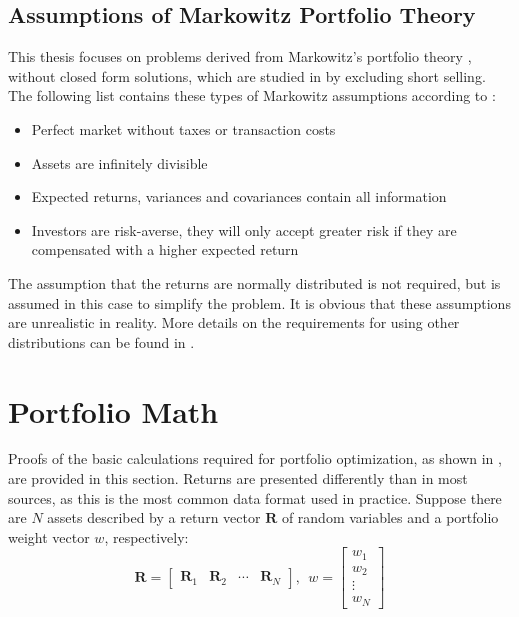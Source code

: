 \documentclass[
  oneside]{book}
\providecommand{\tightlist}{%
  \setlength{\itemsep}{0pt}\setlength{\parskip}{0pt}}
\begin{document}
\hypertarget{assumptions-of-markowitz-portfolio-theory}{%
\subsection{Assumptions of Markowitz Portfolio Theory}\label{assumptions-of-markowitz-portfolio-theory}}

This thesis focuses on problems derived from Markowitz's portfolio theory \citep{Mark1959}, without closed form solutions, which are studied in \citep{Mari2005} by excluding short selling. The following list contains these types of Markowitz assumptions according to \citep{Mari2005}:

\vspace{-0.4cm}

\begin{itemize}
\tightlist
\item
  Perfect market without taxes or transaction costs
\item
  Assets are infinitely divisible
\item
  Expected returns, variances and covariances contain all information
\item
  Investors are risk-averse, they will only accept greater risk if they
  are compensated with a higher expected return
\end{itemize}

The assumption that the returns are normally distributed is not required, but is assumed in this case to simplify the problem. It is obvious that these assumptions are unrealistic in reality. More details on the requirements for using other distributions can be found in \citep{Mari2005}.

\hypertarget{portfolio-math}{%
\section{Portfolio Math}\label{portfolio-math}}

Proofs of the basic calculations required for portfolio optimization, as shown in \citep{Eric2021}, are provided in this section. Returns are presented differently than in most sources, as this is the most common data format used in practice. Suppose there are \(N\) assets described by a return vector \(\pmb{R}\) of random variables and a portfolio weight vector \(w\), respectively:
\[
  \pmb{R} = 
  \begin{bmatrix}
    \pmb{R}_{1} & \pmb{R}_{2} & \cdots & \pmb{R}_{N}  
 \end{bmatrix}
 , \ \ 
 w = 
  \begin{bmatrix}
    w_{1} \\ 
    w_{2} \\
    \vdots \\
    w_{N}  
 \end{bmatrix}
\]
\end{document}
